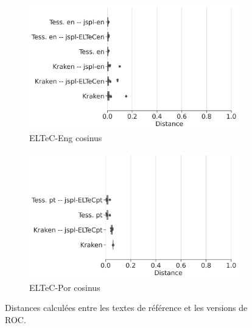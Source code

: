 \begin{figure}[h!]
    
        \begin{subfigure}{0.45\textwidth}
  \includegraphics[height=.65\textwidth]{IMAGES/Boite-moustache/ELTeC-Eng_REF_cosinus.png} 
        \caption{ELTeC-Eng cosinus}
        \label{fig:ELTeC-_REF_jaccard}
   \end{subfigure}
    \begin{subfigure}{0.5\textwidth}
  \includegraphics[height=.65\textwidth]{IMAGES/Boite-moustache/ELTeC-Por_REF_cosinus.png} 
        \caption{ELTeC-Por cosinus}
        \label{fig:ELTeC-Por_REF_cosinus}
   \end{subfigure}   

\label{fig:distance_texte}
 \caption{Distances calculées entre les textes de référence et les versions de ROC.}
    \label{fig:distances_ref_roc}
\end{figure}

